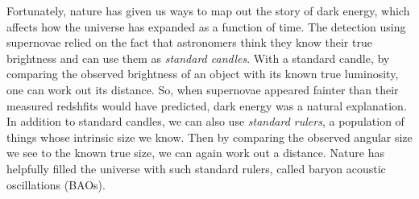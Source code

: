 \documentclass[letterpaper,11pt,preprint]{aastex}
\begin{document}

Fortunately, nature has given us ways to map out the story of dark
energy, which affects how the universe has expanded as a
function of time.  The detection using supernovae relied on
the fact that astronomers think they know their true brightness and
can use them as {\textit{standard candles}}.  With a standard candle,
by comparing the observed brightness of an object with its known true
luminosity, one can work out its distance.  So, when supernovae
appeared fainter than their measured redshfits would have predicted,
dark energy was a natural explanation.  In addition to standard
candles, we can also use {\textit{standard rulers}}, a population of
things whose intrinsic size we know.  Then by comparing the observed
angular size we see to the known true size, we can again work out a
distance.  Nature has helpfully filled the universe with such standard
rulers, called baryon acoustic oscillations (BAOs).  

\end{document}
